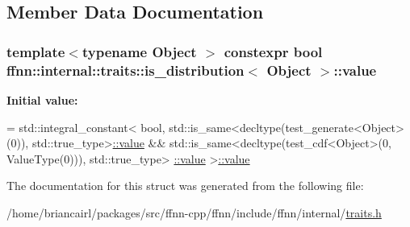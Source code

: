 \subsection{Member Data Documentation}
\hypertarget{structffnn_1_1internal_1_1traits_1_1is__distribution_a7f4813ca467ef824a4f98c1d18442bfc}{
\subsubsection[{value}]{\setlength{\rightskip}{0pt plus 5cm}template$<$typename Object $>$ constexpr bool {\bf ffnn\-::internal\-::traits\-::is\-\_\-distribution}$<$ Object $>$\-::value\hspace{0.3cm}{\ttfamily [static]}}}\label{structffnn_1_1internal_1_1traits_1_1is__distribution_a7f4813ca467ef824a4f98c1d18442bfc}
{\bfseries Initial value\-:}
\begin{DoxyCode}
=
    std::integral\_constant<
      bool,
      std::is\_same<decltype(test\_generate<Object>(0)), std::true\_type>\hyperlink{structffnn_1_1internal_1_1traits_1_1is__distribution_a7f4813ca467ef824a4f98c1d18442bfc}{::value} &&
      std::is\_same<decltype(test\_cdf<Object>(0, ValueType(0))), std::true\_type>
      \hyperlink{structffnn_1_1internal_1_1traits_1_1is__distribution_a7f4813ca467ef824a4f98c1d18442bfc}{::value}
    >\hyperlink{structffnn_1_1internal_1_1traits_1_1is__distribution_a7f4813ca467ef824a4f98c1d18442bfc}{::value}
\end{DoxyCode}


The documentation for this struct was generated from the following file\-:\begin{DoxyCompactItemize}
\item 
/home/briancairl/packages/src/ffnn-\/cpp/ffnn/include/ffnn/internal/\hyperlink{traits_8h}{traits.\-h}\end{DoxyCompactItemize}
